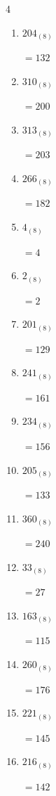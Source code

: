 \begin{multicols}{4}
\begin{enumerate}
  \item $204_{(8)}$

        $=132$

\columnbreak %

  \item $310_{(8)}$

        $=200$

  \item $313_{(8)}$

        $=203$

  \item $266_{(8)}$

        $=182$

  \item $4_{(8)}$

        $=4$

  \item $2_{(8)}$

        $=2$

  \item $201_{(8)}$

        $=129$

  \item $241_{(8)}$

        $=161$

  \item $234_{(8)}$

        $=156$

  \item $205_{(8)}$

        $=133$

  \item $360_{(8)}$

        $=240$

  \item $33_{(8)}$

        $=27$

  \item $163_{(8)}$

        $=115$

  \item $260_{(8)}$

        $=176$

  \item $221_{(8)}$

        $=145$

  \item $216_{(8)}$

        $=142$

\columnbreak %


\end{enumerate}
\end{multicols}
